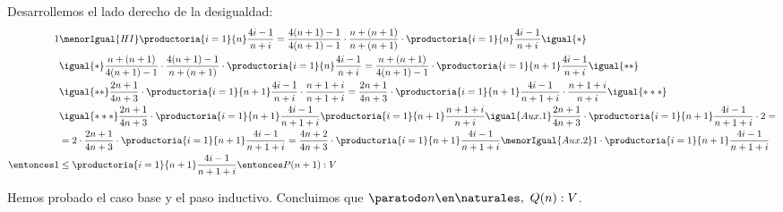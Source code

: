 \begin{enumerate}[label=\roman*)]
\begin{enumerate}[label=\arabic*)]
                Desarrollemos el lado derecho de la desigualdad:
                \begin{align*}
                  1          & \menorIgual{HI} \productoria{i=1}{n} \frac{4i-1}{n+i} = \frac{4(n+1)-1}{4(n+1)-1} \cdot
                  \frac{n + (n+1)}{n + (n+1)} \cdot \productoria{i=1}{n} \frac{4i-1}{n+i} \igual{*}                                 \\
                             & \igual{*}\frac{n+(n+1)}{4(n+1)-1} \cdot
                  \frac{4(n+1)-1}{n+(n+1)} \cdot \productoria{i=1}{n} \frac{4i-1}{n+i} = \frac{n+(n+1)}{4(n+1)-1} \cdot
                  \productoria{i=1}{n+1} \frac{4i-1}{n+i} \igual{**}                                                                \\
                             & \igual{**} \frac{2n+1}{4n+3} \cdot \productoria{i=1}{n+1} \frac{4i-1}{n+i} \cdot \frac{n+1+i}{n+1+i}
                  = \frac{2n+1}{4n+3} \cdot \productoria{i=1}{n+1} \frac{4i-1}{n+1+i} \cdot \frac{n+1+i}{n+i} \igual{***}           \\
                             & \igual{***} \frac{2n+1}{4n+3} \cdot \productoria{i=1}{n+1} \frac{4i-1}{n+1+i}
                  \productoria{i=1}{n+1}  \frac{n+1+i}{n+i} \igual{\tiny Aux.1} \frac{2n+1}{4n+3} \cdot
                  \productoria{i=1}{n+1} \frac{4i-1}{n+1+i} \cdot 2 =                                                                    \\
                             & = 2 \cdot \frac{2n+1}{4n+3} \cdot \productoria{i=1}{n+1} \frac{4i-1}{n+1+i} = \frac{4n+2}{4n+3} \cdot
                  \productoria{i=1}{n+1} \frac{4i-1}{n+1+i} \menorIgual{\tiny Aux.2} 1 \cdot
                  \productoria{i=1}{n+1} \frac{4i-1}{n+1+i}                                                                              \\
                  \entonces 1 & \leq \productoria{i=1}{n+1} \frac{4i-1}{n+1+i} \entonces P(n+1):V
                \end{align*}
        \end{enumerate}

        Hemos probado el caso base y el paso inductivo. Concluimos que $\paratodo n \en \naturales, \ Q(n): V$.


\end{enumerate}
